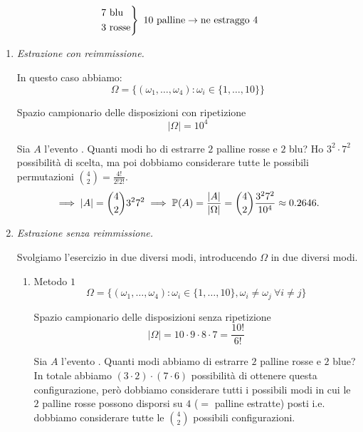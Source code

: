 \Soluzione

\begin{equation*}
	\begin{drcases}
		7\ \text{blu}\\
		3\ \text{rosse}
	\end{drcases}
	\ 10\ \text{palline}\rightarrow \text{ne estraggo} \ 4
\end{equation*}
\begin{enumerate}
	\item \textit{Estrazione con reimmissione.}

	In questo caso abbiamo:
	\begin{equation*}
	\Omega =\{(\omega_{1} ,\dots ,\omega_{4}) :\omega_{i} \in \{1,\dots ,10\}\}
	\end{equation*}

	Spazio campionario delle disposizioni con ripetizione
	\begin{equation*}
	|\Omega| =10^{4}
	\end{equation*}

	Sia $A$ l'evento . Quanti modi ho di estrarre $2$ palline rosse e $2$ blu? Ho $3^{2} \cdot 7^{2}$ possibilità di scelta, ma poi dobbiamo considerare tutte le possibili permutazioni $\binom{4}{2} =\frac{4!}{2!2!}$.
	\begin{equation*}
		\implies |A| =\binom{4}{2} 3^{2} 7^{2}\implies \mathbb{P}(A) =\frac{| A| }{|\Omega| } =\binom{4}{2}\frac{3^{2} 7^{2}}{10^{4}} \approx 0.2646.
	\end{equation*}
	\item \textit{Estrazione senza reimmissione.}

	Svolgiamo l'esercizio in due diversi modi, introducendo $\Omega $ in due diversi modi.
	\begin{enumerate}
		\item Metodo $1$
		\begin{equation*}
			\Omega =\{(\omega_{1} ,\dots ,\omega_{4}) :\omega_{i} \in \{1,\dots ,10\} ,\omega_{i} \neq \omega_{j} \ \forall i\neq j\}
		\end{equation*}

		Spazio campionario delle disposizioni senza ripetizione
		\begin{equation*}
			|\Omega| =10\cdot 9\cdot 8\cdot 7=\frac{10!}{6!}
		\end{equation*}

		Sia $A$ l'evento . Quanti modi abbiamo di estrarre $2$ palline rosse e $2$ blue? In totale abbiamo $(3\cdot 2) \cdot (7\cdot 6)$ possibilità di ottenere questa configurazione, però dobbiamo considerare tutti i possibili modi in cui le $2$ palline rosse possono disporsi su $4$ ($=$ palline estratte) posti i.e. dobbiamo considerare tutte le $\binom{4}{2}$ possibili configurazioni.


\end{enumerate}
\end{enumerate}
